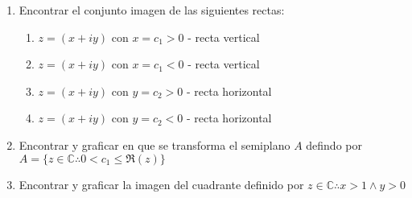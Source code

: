 \documentclass[12pt]{article}
\begin{document}
\begin{enumerate}
\item Encontrar el conjunto imagen de las siguientes rectas:
\begin{enumerate}
\item $z=(x+iy)$ con $x=c_1 > 0$ - recta vertical
\item $z=(x+iy)$ con $x=c_1 < 0$ - recta vertical
\item $z=(x+iy)$ con $y=c_2 > 0$ - recta horizontal
\item $z=(x+iy)$ con $y=c_2 < 0$ - recta horizontal
\end{enumerate}
\item Encontrar y graficar en que se transforma el semiplano $A$ defindo por $A=\lbrace z \in \mathbb{C} \therefore 0 < c_1 \leq \mathrm{\Re }(z) \rbrace$
\item Encontrar y graficar la imagen del cuadrante definido por $z \in \mathbb{C} \therefore x > 1 \wedge y > 0$
\end{enumerate}
\end{document}
